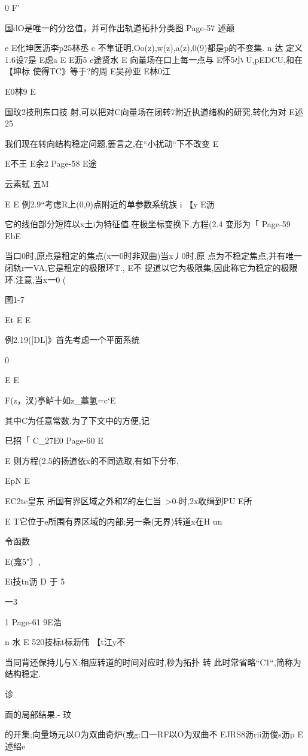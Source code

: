 {0
F'

国dO是唯一的分岔值，并可作出轨道拓扑分类图
Page-57
述颠

e
E化坤医沥李p25林丞
c
不隼证明,Oo(z),w(z),a(z),0(9)都是p的不变集.
n
达
定义1.6设7是
E虑a
E
E沥5
e途贤水
E
向量场在口上每一点与
E怀5小
U,pEDCU,和在
【坤标
使得TC》等于?的周
E吴孙亚
E林0江

E0林9
E

国玟2技刑东口技
射,可以把对C向量场在闭转7附近执道绪构的研究,转化为对
E述25

我们现在转向结构稳定问题,篓言之,在“小扰动“下不改变
E

E不王
E余2
Page-58
E途

云素轼
五M

E
E
例2.9“考虑R上(0,0)点附近的单参数系统族
i
【y
E沥

它的线伯部分短阵以x土i为特征值.在极坐标变换下,方程(2.4
变形为「
Page-59
EbE

当口0时,原点是租定的焦点(x一0时非双曲)当x丿0时,原
点为不稳定焦点,并有唯一闭轨r一VA,它是租定的极限环T.,
E不
捉道以它为极限集,因此称它为稳定的极限环.注意,当x一0
(

图1-7

Et
E
E

例2.19([DL]》首先考虑一个平面系统

0

E
E

F(z，汊)亭鲈十如z_藁氢=c`E

其中C为任意常数.为了下文中的方便,记

巳招「
C_27E0
Page-60
E

E
则方程(2.5的扬道依x的不同选取,有如下分布,

EpN
E

EC2te皇东
所国有界区域之外和Z的左仁当~>0-时,2x收缉到PU
E所

E
T它位于e所围有界区域的内部;另一条(无界)转道x在H
un

令函数

E(龛5″〕,

Ei技tn沥
D
于
5

一3

1
Page-61
9E浩

n
水
E
520技标t标沥伟
【t江y不

当同背还保持儿与X:相应转道的时间对应时,秒为拓扑
转
此时常省略“C1“,简称为结构稳定.

诊

面的局部结果.-
玟

的开集;向量场元以O为双曲奇炉(或g:口一RF以O为双曲不
EJRS8沥rii沥俊s沥p
E述绍e

}
